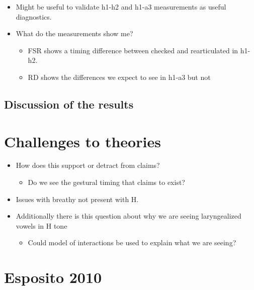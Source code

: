 \documentclass[12pt, letterpaper]{article}
\begin{document}
\begin{itemize}
	\item Might be useful to validate h1-h2 and h1-a3 measurements as useful diagnostics. 
	\item What do the measurements show me?
	\begin{itemize}
		\item FSR shows a timing difference between checked and rearticulated in h1-h2.
		\item RD shows the differences we expect to see in h1-a3 but not 
	\end{itemize}
\end{itemize}

\subsection{Discussion of the results} \label{sec:Discussion}

\section{Challenges to theories} \label{sec:Challenges}

\begin{itemize}
	\item How does this support or detract from  claims?
	\begin{itemize}
		\item Do we see the gestural timing that \citet{silvermanLaryngealComplexityOtomanguean1997} claims to exist?
	\end{itemize}
	\item Issues with breathy not present with H. 
	\item Additionally there is this question about why we are seeing laryngealized vowels in H tone
	\begin{itemize}
		\item Could  model of interactions be used to explain what we are seeing?
	\end{itemize}
\end{itemize}




\section{Esposito 2010} \label{sec:Esposito}
\end{document}
